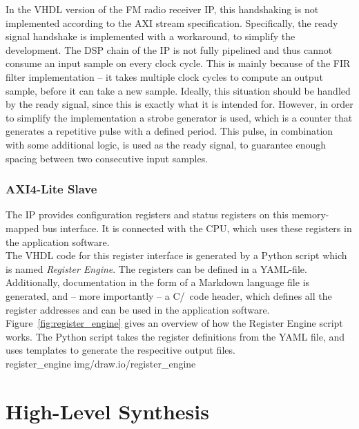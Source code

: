 In the VHDL version of the FM radio receiver IP, this handshaking is not implemented according to the AXI stream specification.
Specifically, the ready signal handshake is implemented with a workaround, to simplify the development.
The DSP chain of the IP is not fully pipelined and thus cannot consume an input sample on every clock cycle.
This is mainly because of the FIR filter implementation -- it takes multiple clock cycles to compute an output sample, before it can take a new sample.
Ideally, this situation should be handled by the ready signal, since this is exactly what it is intended for.
However, in order to simplify the implementation a strobe generator is used, which is a counter that generates a repetitive pulse with a defined period.
This pulse, in combination with some additional logic, is used as the ready signal, to guarantee enough spacing between two consecutive input samples.

\subsubsection{AXI4-Lite Slave}

The IP provides configuration registers and status registers on this memory-mapped bus interface.
It is connected with the CPU, which uses these registers in the application software.\\

The VHDL code for this register interface is generated by a Python script which is named \textit{Register Engine}.
The registers can be defined in a YAML-file.
Additionally, documentation in the form of a Markdown language file is generated, and -- more importantly -- a C/\cplusplus\ code header, which defines all the register addresses and can be used in the application software.\\

Figure~\ref{fig:register_engine} gives an overview of how the Register Engine script works.
The Python script takes the register definitions from the YAML file, and uses templates to generate the respecitive output files.\\

 {register_engine} {img/draw.io/register_engine}


\section{High-Level Synthesis}


